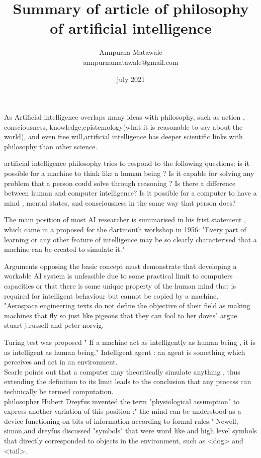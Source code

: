 \documentclass[12pt]{article}
\title{Summary of article of philosophy of artificial intelligence}
\author{Annpurna Matawale\\annpurnamatawale@gmail.com}
\date{ july 2021}
\begin{document}
\maketitle













As Artificial intelligence overlaps many ideas with philosophy, such as action , consciousness, knowledge,epistemology(what it is reasonable to say about the world), and even free will,artificial intelligence has deeper scientific links with philosophy than other science.

artificial intelligence philosophy tries to respond to the following questions: is it possible for a machine to think like a human being ? Is it capable for solving any problem that a person could solve through reasoning ? Is there a difference between human and computer intelligence? Is it possible for a computer to have a mind , mental states, and consciousness in the same way that person does?







The main position of most AI researcher is summarised in his frist statement , which came in a proposed for the dartmouth  workshop in 1956: "Every part of learning or any other feature of intelligence may be so clearly characterised that a machine can be created to simulate it."

Arguments opposing the basic concept must demonstrate that developing a workable AI system is unfeasible due to some practical limit to computers capacities or that there is some unique property of the human mind that is required for intelligent behaviour but cannot be copied by a machine.
\\"Aerospace engineering texts do not define the objective of their field as making machines that fly so just like pigeons that they can fool to her doves" argue stuart j.russell and peter norvig.

Turing test was proposed " If a machine act as intelligently as human being , it is as intelligent as human being."
Intelligent agent : an agent is something which perceives and act in an environment.
\\Searle points out that a computer may theoritically simulate anything , thus extending the definition to its limit leads to the conclusion that any process can technically be termed computation.
\\philosopher Hubert Dreyfus invented the term "physiological assumption" to express another variation of this position :" the mind can be understood as a device functioning on bits of information according to formal rules."
Newell, simon,and dreyfus discussed "symbols" that were word like and high level symbols that directly corresponded to objects in the environment, such as <dog> and <tail>.
\end{document}
